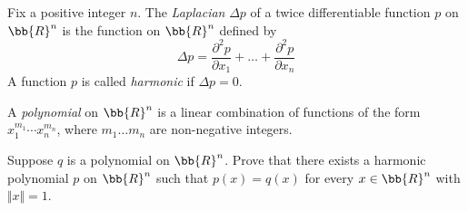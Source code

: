 \documentclass[12pt,letterpaper]{hmcpset}
\begin{document}
\begin{problem}[30]
	Fix a positive integer $n$. The \emph{Laplacian} $\Delta p$ of a twice differentiable function $p$ on $\bb{R}^n$ is the function on $\bb{R}^n$ defined by
	\[
		\Delta p = \frac{\partial^2 p}{\partial x_1} + \ldots + \frac{\partial^2 p}{\partial x_n}
	\]
A function $p$ is called \emph{harmonic} if \( \Delta p = 0 \).

A \emph{polynomial} on $\bb{R}^n$ is a linear combination of functions of the form \( x_1^{m_1} \cdots x_n^{m_n} \), where \( m_1 \ldots m_n \) are non-negative integers.

	Suppose $q$ is a polynomial on $\bb{R}^n$. Prove that there exists a harmonic polynomial $p$ on $\bb{R}^n$ such that \( p(x) = q(x) \) for every \( x \in \bb{R}^n \) with \( \Vert x \Vert = 1 \).
\end{problem}
\end{document}
